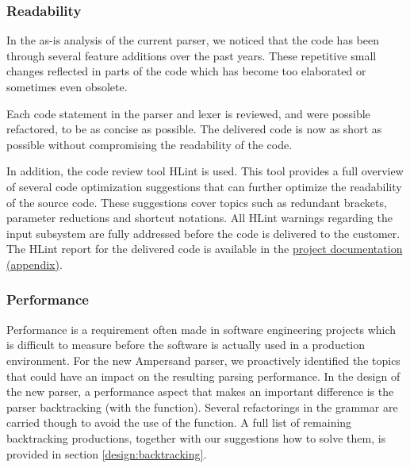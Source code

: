 \subsubsection{Readability}
  In the as-is analysis of the current parser, we noticed that the code has been through several feature additions over the past years.
  These repetitive small changes reflected in parts of the code which has become too elaborated or sometimes even obsolete.

  Each code statement in the parser and lexer is reviewed, and were possible refactored, to be as concise as possible.
  The delivered code is now as short as possible without compromising the readability of the code.

  In addition, the code review tool HLint is used.
  This tool provides a full overview of several code optimization suggestions that can further optimize the readability of the source code. 
  These suggestions cover topics such as redundant brackets, parameter reductions and shortcut notations.
  All HLint warnings regarding the input subsystem are fully addressed before the code is delivered to the customer.
  The HLint report for the delivered code is available in the \hyperref[app:docs]{project documentation (appendix)}.

\subsubsection{Performance}
  Performance is a requirement often made in software engineering projects which is difficult to measure before the software is actually used in a production environment.
  For the new Ampersand parser, we proactively identified the topics that could have an impact on the resulting parsing performance.
  In the design of the new parser, a performance aspect that makes an important difference is the parser backtracking (with the  function).
  Several refactorings in the grammar are carried though to avoid the use of the  function. 
  A full list of remaining backtracking productions, together with our suggestions how to solve them, is provided in section \autoref{design:backtracking}.
